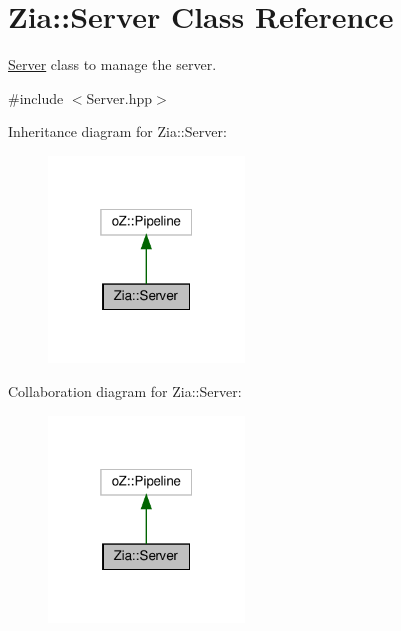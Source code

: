 \hypertarget{class_zia_1_1_server}{}\section{Zia\+:\+:Server Class Reference}
\label{class_zia_1_1_server}


\hyperlink{class_zia_1_1_server}{Server} class to manage the server.  




{\ttfamily \#include $<$Server.\+hpp$>$}



Inheritance diagram for Zia\+:\+:Server\+:\nopagebreak
\begin{figure}[H]
\begin{center}
\leavevmode
\includegraphics[width=148pt]{class_zia_1_1_server__inherit__graph}
\end{center}
\end{figure}


Collaboration diagram for Zia\+:\+:Server\+:\nopagebreak
\begin{figure}[H]
\begin{center}
\leavevmode
\includegraphics[width=148pt]{class_zia_1_1_server__coll__graph}
\end{center}
\end{figure}
